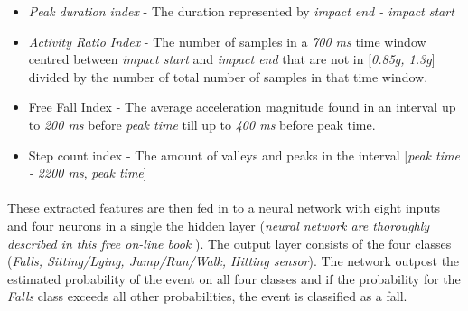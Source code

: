 \documentclass[12pt, a4paper, onecolumn]{article}
\begin{document}
\begin{itemize}
			\item \textit{Peak duration index} - The duration represented by \textit{impact end - impact start}
			\item \textit{Activity Ratio Index} - The number of samples in a \textit{700 ms} time window centred between \textit{impact start} and \textit{impact end} that are not in [\textit{0.85g, 1.3g}] divided by the number of total number of samples in that time window.
			
			\item{Free Fall Index} - The average acceleration magnitude found in an interval up to \textit{200 ms} before \textit{peak time} till up to \textit{400 ms} before peak time.
			
			\item{Step count index} - The amount of valleys and peaks in the interval [\textit{peak time - 2200 ms}, \textit{peak time}]
		\end{itemize}
	
		
		\paragraph{} These extracted features are then fed in to a neural network with eight inputs and four neurons in a single the hidden layer (\textit{neural network are thoroughly described in this free on-line book}  \cite{neural_networks}). The output layer consists of the four classes (\textit{Falls, Sitting/Lying, Jump/Run/Walk, Hitting sensor}). The network outpost the estimated probability of the event on all four classes and if the probability for the \textit{Falls}  class exceeds all other probabilities, the event is classified as a fall.
		
		

	
\newpage




\end{document}
